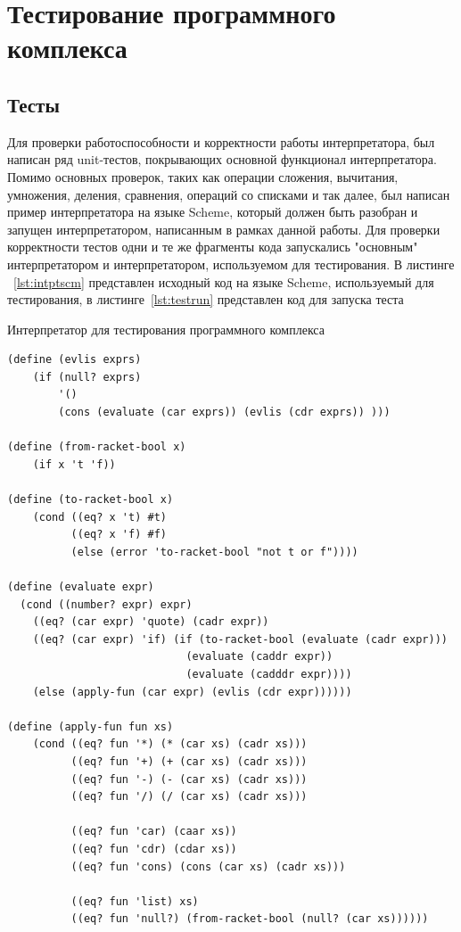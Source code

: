 \documentclass[14pt, russian]{scrartcl}
\newenvironment{longlisting}{\captionsetup{type=listing}}{}
\begin{document}
\section{Тестирование программного комплекса}

\subsection{Тесты}

Для проверки работоспособности и корректности работы интерпретатора, был написан ряд unit-тестов, покрывающих основной функционал интерпретатора. Помимо основных проверок, таких как операции сложения, вычитания, умножения, деления, сравнения, операций со списками и так далее, был написан пример интерпретатора на языке Scheme, который должен быть разобран и запущен интерпретатором, написанным в рамках данной работы. Для проверки корректности тестов одни и те же фрагменты кода запускались "основным" интерпретатором и интерпретатором, используемом для тестирования. В листинге ~\ref{lst:intptscm} представлен исходный код на языке Scheme, используемый для тестирования, в листинге~\ref{lst:testrun} представлен код для запуска теста

\begin{longlisting}
\caption{Интерпретатор для тестирования программного комплекса}
\label{lst:intptscm}
\begin{verbatim}
(define (evlis exprs)
    (if (null? exprs)
        '()
        (cons (evaluate (car exprs)) (evlis (cdr exprs)) )))

(define (from-racket-bool x)
    (if x 't 'f))

(define (to-racket-bool x)
    (cond ((eq? x 't) #t)
          ((eq? x 'f) #f)
          (else (error 'to-racket-bool "not t or f"))))

(define (evaluate expr)
  (cond ((number? expr) expr)
    ((eq? (car expr) 'quote) (cadr expr))
    ((eq? (car expr) 'if) (if (to-racket-bool (evaluate (cadr expr)))
                            (evaluate (caddr expr))
                            (evaluate (cadddr expr))))
    (else (apply-fun (car expr) (evlis (cdr expr))))))
                            
(define (apply-fun fun xs)
    (cond ((eq? fun '*) (* (car xs) (cadr xs)))
          ((eq? fun '+) (+ (car xs) (cadr xs)))
          ((eq? fun '-) (- (car xs) (cadr xs)))
          ((eq? fun '/) (/ (car xs) (cadr xs)))
          
          ((eq? fun 'car) (caar xs))
          ((eq? fun 'cdr) (cdar xs))
          ((eq? fun 'cons) (cons (car xs) (cadr xs)))
          
          ((eq? fun 'list) xs)
          ((eq? fun 'null?) (from-racket-bool (null? (car xs))))))
\end{verbatim}
\end{longlisting}
\end{document}
